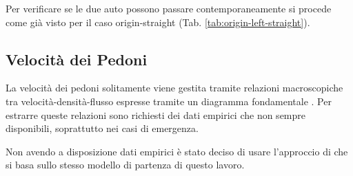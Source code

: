 Per verificare se le due auto possono passare contemporaneamente si procede come già visto per il caso origin-straight (Tab. \ref{tab:origin-left-straight}).


\subsection{Velocità dei Pedoni}
La velocità dei pedoni solitamente viene gestita tramite relazioni macroscopiche tra velocità-densità-flusso
espresse tramite un diagramma fondamentale \parencite{nikolic2016probabilistic}.
Per estrarre queste relazioni sono richiesti dei dati empirici che non sempre disponibili, soprattutto nei casi di emergenza.

Non avendo a disposizione dati empirici è stato deciso di usare l'approccio di \textcite{wang2021novel}
che si basa sullo stesso modello di partenza di questo lavoro.

